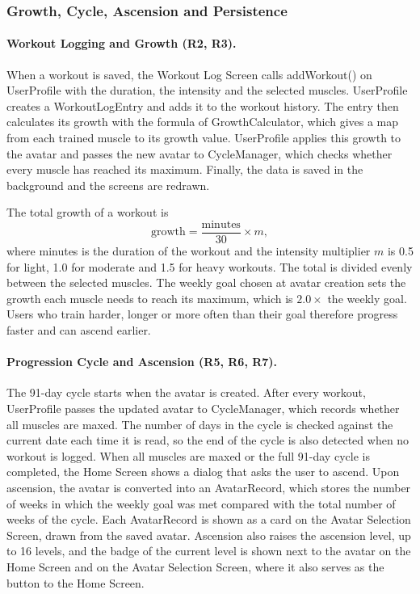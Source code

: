 \documentclass[11pt]{article}
\begin{document}
\subsubsection{Growth, Cycle, Ascension and Persistence}
\label{sec:growthcycle}

\paragraph{Workout Logging and Growth (R2, R3).}
When a workout is saved, the Workout Log Screen calls addWorkout() on UserProfile with the duration, the intensity
and the selected muscles. UserProfile creates a WorkoutLogEntry and adds it to the workout history. The entry then
calculates its growth with the formula of GrowthCalculator, which gives a map from each trained muscle to its growth
value. UserProfile applies this growth to the avatar and passes the new avatar to CycleManager, which checks whether
every muscle has reached its maximum. Finally, the data is saved in the background and the screens are redrawn.

The total growth of a workout is
\[
  \mathrm{growth} = \frac{\mathrm{minutes}}{30} \times m,
\]
where minutes is the duration of the workout and the intensity multiplier $m$ is 0.5 for light, 1.0 for moderate and 1.5 for heavy workouts. The total is divided
evenly between the selected muscles. The weekly goal chosen at avatar creation sets the growth each muscle needs to
reach its maximum, which is $2.0 \times$ the weekly goal. Users who train harder, longer or more often than their
goal therefore progress faster and can ascend earlier.

\paragraph{Progression Cycle and Ascension (R5, R6, R7).}
The 91-day cycle starts when the avatar is created. After every workout, UserProfile passes the updated avatar to
CycleManager, which records whether all muscles are maxed. The number of days in the cycle is checked against the
current date each time it is read, so the end of the cycle is also detected when no workout is logged. When all
muscles are maxed or the full 91-day cycle is completed, the Home Screen shows a dialog that asks the user to
ascend. Upon ascension, the avatar is converted into an AvatarRecord, which stores the number of weeks in which the
weekly goal was met compared with the total number of weeks of the cycle. Each AvatarRecord is shown as a card on the
Avatar Selection Screen, drawn from the saved avatar. Ascension also raises the ascension level, up to 16 levels, and
the badge of the current level is shown next to the avatar on the Home Screen and on the Avatar Selection Screen,
where it also serves as the button to the Home Screen.
\end{document}

